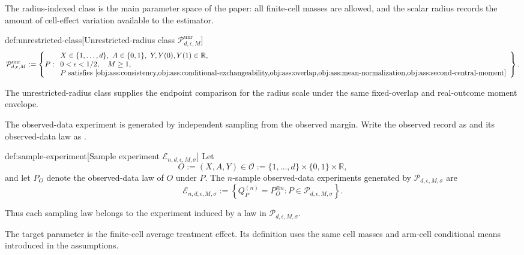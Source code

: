 The radius-indexed class  is the main parameter space of the paper: all finite-cell masses are allowed, and the scalar radius records the amount of cell-effect variation available to the estimator.

\begin{definitionv}{def:unrestricted-class}[Unrestricted-radius class \(\mathcal P_{d,\epsilon,M}^{\mathrm{unr}}\)]
\[
\mathcal P_{d,\epsilon,M}^{\mathrm{unr}}
:=
\left\{
P:
\begin{array}{l}
X\in\{1,\ldots,d\},\ A\in\{0,1\},\ Y,Y(0),Y(1)\in\mathbb R,\\
0<\epsilon<1/2,\quad M\ge 1,\\
P\text{ satisfies }\cref{obj:ass:consistency,obj:ass:conditional-exchangeability,obj:ass:overlap,obj:ass:mean-normalization,obj:ass:second-central-moment}
\end{array}
\right\}.
\]
\end{definitionv}

The unrestricted-radius class  supplies the endpoint comparison for the radius scale under the same fixed-overlap and real-outcome moment envelope.

The observed-data experiment is generated by independent sampling from the observed margin. Write the observed record as  and its observed-data law as .

\begin{definitionv}{def:sample-experiment}[Sample experiment \(\mathcal E_{n,d,\epsilon,M,\sigma}\)]
Let
\[
O:=(X,A,Y)\in\mathcal O:=\{1,\ldots,d\}\times\{0,1\}\times\mathbb R,
\]
and let \(P_O\) denote the observed-data law of \(O\) under \(P\). The \(n\)-sample observed-data experiments generated by \(\mathcal P_{d,\epsilon,M,\sigma}\) are
\[
\mathcal E_{n,d,\epsilon,M,\sigma}
:=
\left\{
Q_P^{(n)}=P_O^{\otimes n}:P\in\mathcal P_{d,\epsilon,M,\sigma}
\right\}.
\]
\end{definitionv}

Thus each sampling law  belongs to the experiment  induced by a law in \(\mathcal P_{d,\epsilon,M,\sigma}\).

The target parameter is the finite-cell average treatment effect. Its definition uses the same cell masses and arm-cell conditional means introduced in the assumptions.

